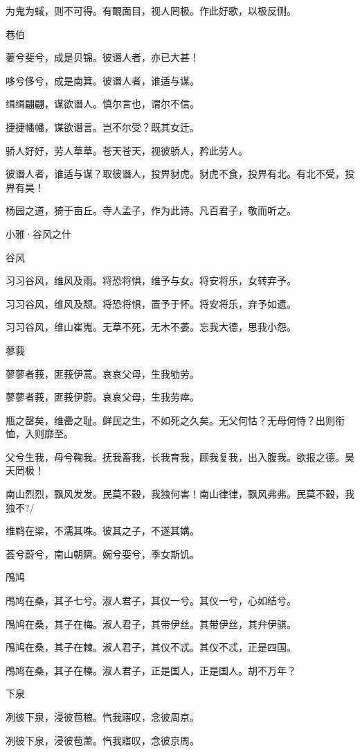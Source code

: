 为鬼为蜮，则不可得。有靦面目，视人罔极。作此好歌，以极反侧。

巷伯

萋兮斐兮，成是贝锦。彼谮人者，亦已大甚！

哆兮侈兮，成是南箕。彼谮人者，谁适与谋。

缉缉翩翩，谋欲谮人。慎尔言也，谓尔不信。

捷捷幡幡，谋欲谮言。岂不尔受？既其女迁。

骄人好好，劳人草草。苍天苍天，视彼骄人，矜此劳人。

彼谮人者，谁适与谋？取彼谮人，投畀豺虎。豺虎不食，投畀有北。有北不受，投畀有昊！

杨园之道，猗于亩丘。寺人孟子，作为此诗。凡百君子，敬而听之。




小雅·谷风之什


谷风

习习谷风，维风及雨。将恐将惧，维予与女。将安将乐，女转弃予。

习习谷风，维风及颓。将恐将惧，置予于怀。将安将乐，弃予如遗。

习习谷风，维山崔嵬。无草不死，无木不萎。忘我大德，思我小怨。

蓼莪

蓼蓼者莪，匪莪伊蒿。哀哀父母，生我劬劳。

蓼蓼者莪，匪莪伊蔚。哀哀父母，生我劳瘁。

瓶之罄矣，维罍之耻。鲜民之生，不如死之久矣。无父何怙？无母何恃？出则衔恤，入则靡至。

父兮生我，母兮鞠我。抚我畜我，长我育我，顾我复我，出入腹我。欲报之德。昊天罔极！

南山烈烈，飘风发发。民莫不穀，我独何害！南山律律，飘风弗弗。民莫不穀，我独不?/

维鹈在梁，不濡其咮。彼其之子，不遂其媾。

荟兮蔚兮，南山朝隮。婉兮娈兮，季女斯饥。

鳲鸠

鳲鸠在桑，其子七兮。淑人君子，其仪一兮。其仪一兮，心如结兮。

鳲鸠在桑，其子在梅。淑人君子，其带伊丝。其带伊丝，其弁伊骐。

鳲鸠在桑，其子在棘。淑人君子，其仪不忒。其仪不忒，正是四国。

鳲鸠在桑，其子在榛。淑人君子，正是国人，正是国人。胡不万年？

下泉

冽彼下泉，浸彼苞稂。忾我寤叹，念彼周京。

冽彼下泉，浸彼苞萧。忾我寤叹，念彼京周。

